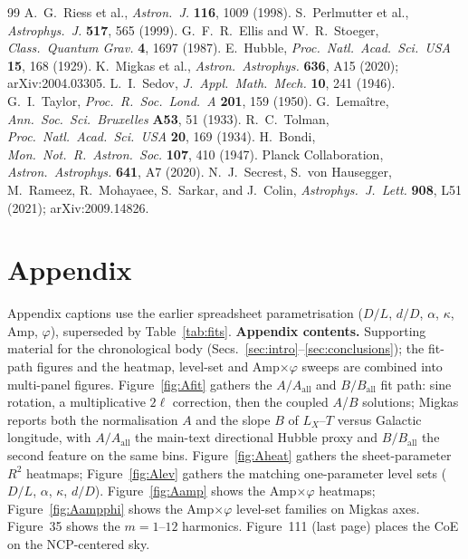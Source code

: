 \documentclass[11pt,a4paper]{article}
\begin{document}
\begingroup
\footnotesize
\setlength{\itemsep}{0.1em}
\setlength{\parsep}{0pt}
\begin{thebibliography}{99}
A.~G.~Riess et al., \textit{Astron.\ J.} \textbf{116}, 1009 (1998).
S.~Perlmutter et al., \textit{Astrophys.\ J.} \textbf{517}, 565 (1999).
G.~F.~R.~Ellis and W.~R.~Stoeger, \textit{Class.\ Quantum Grav.} \textbf{4}, 1697 (1987).
E.~Hubble, \textit{Proc.\ Natl.\ Acad.\ Sci.\ USA} \textbf{15}, 168 (1929).
K.~Migkas et al., \textit{Astron.\ Astrophys.} \textbf{636}, A15 (2020); arXiv:2004.03305.
L.~I.~Sedov, \textit{J.\ Appl.\ Math.\ Mech.} \textbf{10}, 241 (1946).
G.~I.~Taylor, \textit{Proc.\ R.\ Soc.\ Lond.\ A} \textbf{201}, 159 (1950).
G.~Lema\^itre, \textit{Ann.\ Soc.\ Sci.\ Bruxelles} \textbf{A53}, 51 (1933).
R.~C.~Tolman, \textit{Proc.\ Natl.\ Acad.\ Sci.\ USA} \textbf{20}, 169 (1934).
H.~Bondi, \textit{Mon.\ Not.\ R.\ Astron.\ Soc.} \textbf{107}, 410 (1947).
Planck Collaboration, \textit{Astron.\ Astrophys.} \textbf{641}, A7 (2020).
N.~J.~Secrest, S.~von Hausegger, M.~Rameez, R.~Mohayaee, S.~Sarkar, and J.~Colin, \textit{Astrophys.\ J.\ Lett.} \textbf{908}, L51 (2021); arXiv:2009.14826.
\end{thebibliography}
\endgroup

\section*{Appendix}
Appendix captions use the earlier spreadsheet parametrisation (\(D/L\), \(d/D\), \(\alpha\), \(\kappa\), Amp, \(\varphi\)), superseded by Table~\ref{tab:fits}.
\noindent\textbf{Appendix contents.}
Supporting material for the chronological body (Secs.~\ref{sec:intro}--\ref{sec:conclusions}); the fit-path figures and the heatmap, level-set and Amp$\times\varphi$ sweeps are combined into multi-panel figures.
Figure~\ref{fig:Afit} gathers the \(A/A_{\mathrm{all}}\) and \(B/B_{\mathrm{all}}\) fit path: sine rotation, a multiplicative \(2\ell\) correction, then the coupled \(A\)/\(B\) solutions; Migkas reports both the normalisation \(A\) and the slope \(B\) of \(L_X\)--\(T\) versus Galactic longitude, with \(A/A_{\mathrm{all}}\) the main-text directional Hubble proxy and \(B/B_{\mathrm{all}}\) the second feature on the same bins.
Figure~\ref{fig:Aheat} gathers the sheet-parameter \(R^2\) heatmaps; Figure~\ref{fig:Alev} gathers the matching one-parameter level sets (\(D/L\), \(\alpha\), $\kappa$, $d/D$).
Figure~\ref{fig:Aamp} shows the Amp$\times\varphi$ heatmaps; Figure~\ref{fig:Aampphi} shows the Amp$\times\varphi$ level-set families on Migkas axes.
Figure~35 shows the \(m=1\)--\(12\) harmonics.
Figure~111 (last page) places the CoE on the NCP-centered sky.
\end{document}
